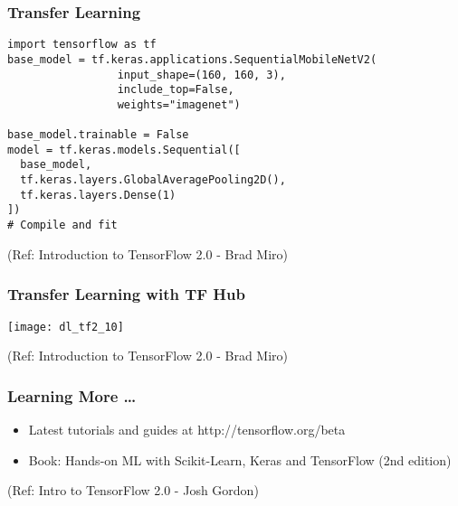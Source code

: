\begin{frame}[fragile] \frametitle{Transfer Learning}

\begin{lstlisting}
import tensorflow as tf 
base_model = tf.keras.applications.SequentialMobileNetV2(
                 input_shape=(160, 160, 3),
                 include_top=False,
                 weights="imagenet")
								 
base_model.trainable = False
model = tf.keras.models.Sequential([
  base_model,
  tf.keras.layers.GlobalAveragePooling2D(),
  tf.keras.layers.Dense(1)
])
# Compile and fit
\end{lstlisting}


\tiny{(Ref: Introduction to TensorFlow 2.0 - Brad Miro)}
\end{frame}
\begin{frame}[fragile] \frametitle{Transfer Learning with TF Hub}

\begin{center}
\texttt{[image: dl\_tf2\_10]}
\end{center}




\tiny{(Ref: Introduction to TensorFlow 2.0 - Brad Miro)}
\end{frame}

\begin{frame}[fragile] \frametitle{Learning More \ldots}

\begin{itemize}
\item  Latest tutorials and guides at http://tensorflow.org/beta
\item Book: Hands-on ML with Scikit-Learn, Keras and TensorFlow (2nd edition) 
\end{itemize}
\tiny{(Ref: Intro to TensorFlow 2.0 - Josh Gordon)}
\end{frame}